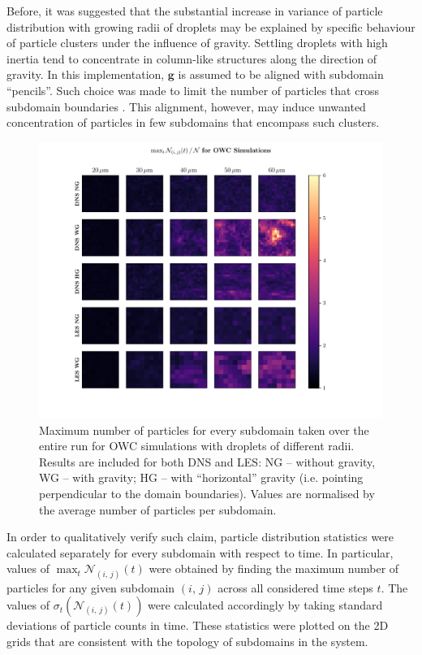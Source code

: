 \documentclass{pracamgren}
\begin{document}
Before, it was suggested that the substantial increase in variance of particle distribution with growing radii of droplets may be explained by specific behaviour of particle clusters under the influence of gravity.
Settling droplets with high inertia tend to concentrate in column-like structures along the direction of gravity.
In this implementation, $\mathbf{g}$ is assumed to be aligned with subdomain ``pencils''.
Such choice was made to limit the number of particles that cross subdomain boundaries \parencite{Ayala2014}.
This alignment, however, may induce unwanted concentration of particles in few subdomains that encompass such clusters.

\begin{figure}[!htbp]
\centering
\includegraphics[width=17cm]{figures/3-18_pfpgridowcmax.pdf}
\caption{
Maximum number of particles for every subdomain taken over the entire run for OWC simulations with droplets of different radii.
Results are included for both DNS and LES: NG -- without gravity, WG -- with gravity; HG -- with ``horizontal'' gravity (i.e. pointing perpendicular to the domain boundaries).
Values are normalised by the average number of particles per subdomain.
}
\label{fig:pfpgridowcmax}
\end{figure}

In order to qualitatively verify such claim, particle distribution statistics were calculated separately for every subdomain with respect to time.
In particular, values of $\max_{t} \mathcal{N}_{(i,\,j)}(t)$ were obtained by finding the maximum number of particles for any given subdomain $(i,\,j)$ across all considered time steps $t$.
The values of $\sigma_{t} (\mathcal{N}_{(i,\,j)}(t))$ were calculated accordingly by taking standard deviations of particle counts in time.
These statistics were plotted on the 2D grids that are consistent with the topology of subdomains in the system.
\end{document}
